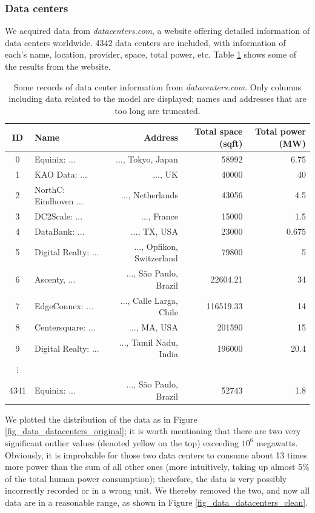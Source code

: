 \documentclass[12pt]{article}
\begin{document}
\subsubsection{Data centers}

We acquired data from \textit{datacenters.com}, a website offering detailed information of data centers worldwide. 4342 data centers \citep{datacenters_com} are included, with information of each's name, location, provider, space, total power, etc. Table \ref{table_data_datacenters.com} shows some of the results from the website.

\begin{table}[t]
	\centering
	\caption{Some records of data center information from \textit{datacenters.com}. Only columns including data related to the model are displayed; names and addresses that are too long are truncated.}
	\label{table_data_datacenters.com}
	\small
	\begin{tabular}{clrrr}
		\hline
		\textbf{ID} & \textbf{Name} & \textbf{Address} & \textbf{Total space} (sqft) & \textbf{Total power} (MW) \\
		\hline
		0 & Equinix: ... & ..., Tokyo, Japan & 58992 & 6.75 \\
		1 & KAO Data: ... & ..., UK & 40000 & 40 \\
		2 & NorthC: Eindhoven ... & ..., Netherlands & 43056 & 4.5 \\
		3 & DC2Scale: ... & ..., France & 15000 & 1.5 \\
		4 & DataBank: ... & ..., TX, USA & 23000 & 0.675 \\
		5 & Digital Realty: ... & ..., Opfikon, Switzerland & 79800 & 5 \\
		6 & Ascenty, ... & ..., São Paulo, Brazil & 22604.21 & 34 \\
		7 & EdgeConnex: ... & ..., Calle Larga, Chile & 116519.33 & 14 \\
		8 & Centersquare: ... & ..., MA, USA & 201590 & 15 \\
		9 & Digital Realty: ... & ..., Tamil Nadu, India & 196000 & 20.4 \\
		$\vdots$ &&&& \\
		4341 & Equinix: ... & ..., São Paulo, Brazil & 52743 & 1.8 \\
		\hline
	\end{tabular}
\end{table}

We plotted the distribution of the data as in Figure \ref{fig_data_datacenters_original}; it is worth mentioning that there are two very significant outlier values (denoted yellow on the top) exceeding $10^6$ megawatts. Obviously, it is improbable for those two data centers to consume about 13 times more power than the sum of all other ones (more intuitively, taking up almost 5\% of the total human power consumption); therefore, the data is very possibly incorrectly recorded or in a wrong unit. We thereby removed the two, and now all data are in a reasonable range, as shown in Figure \ref{fig_data_datacenters_clean}.
\end{document}

